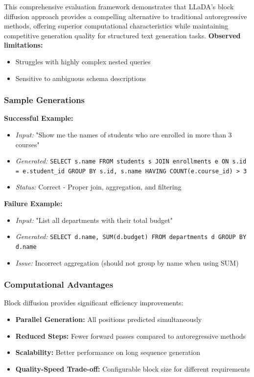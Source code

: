 \documentclass[a4paper,12pt]{article}
\begin{document}
This comprehensive evaluation framework demonstrates that LLaDA's block diffusion approach provides a compelling alternative to traditional autoregressive methods, offering superior computational characteristics while maintaining competitive generation quality for structured text generation tasks.
\textbf{Observed limitations:}
\begin{itemize}
    \item Struggles with highly complex nested queries
    \item Sensitive to ambiguous schema descriptions
\end{itemize}

\subsubsection*{Sample Generations}
\textbf{Successful Example:}
\begin{itemize}
    \item \textit{Input:} "Show me the names of students who are enrolled in more than 3 courses"
    \item \textit{Generated:} \texttt{SELECT s.name FROM students s JOIN enrollments e ON s.id = e.student\_id GROUP BY s.id, s.name HAVING COUNT(e.course\_id) > 3}
    \item \textit{Status:} Correct - Proper join, aggregation, and filtering
\end{itemize}

\textbf{Failure Example:}
\begin{itemize}
    \item \textit{Input:} "List all departments with their total budget"
    \item \textit{Generated:} \texttt{SELECT d.name, SUM(d.budget) FROM departments d GROUP BY d.name}
    \item \textit{Issue:} Incorrect aggregation (should not group by name when using SUM)
\end{itemize}

\subsubsection*{Computational Advantages}
Block diffusion provides significant efficiency improvements:

\begin{itemize}
    \item \textbf{Parallel Generation:} All positions predicted simultaneously
    \item \textbf{Reduced Steps:} Fewer forward passes compared to autoregressive methods
    \item \textbf{Scalability:} Better performance on long sequence generation
    \item \textbf{Quality-Speed Trade-off:} Configurable block size for different requirements
\end{itemize}
\end{document}
